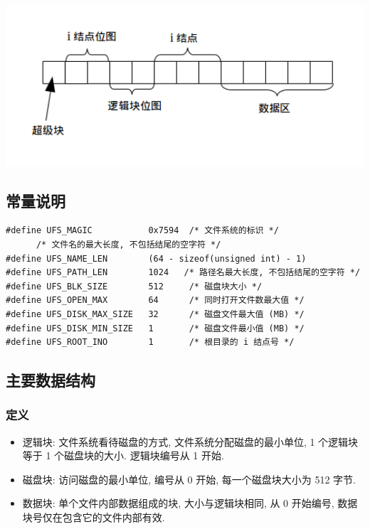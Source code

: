 \documentclass[nofonts, titlepage]{ctexart}
\begin{document}
\begin{center}
\includegraphics[width=14cm]{./images/./layout.png}
\label{fig:layout}
\end{center}

\subsection{常量说明}\label{ux5e38ux91cfux8bf4ux660e}

\begin{verbatim}
#define UFS_MAGIC           0x7594  /* 文件系统的标识 */
      /* 文件名的最大长度, 不包括结尾的空字符 */
#define UFS_NAME_LEN        (64 - sizeof(unsigned int) - 1)
#define UFS_PATH_LEN        1024   /* 路径名最大长度, 不包括结尾的空字符 */
#define UFS_BLK_SIZE        512     /* 磁盘块大小 */
#define UFS_OPEN_MAX        64      /* 同时打开文件数最大值 */
#define UFS_DISK_MAX_SIZE   32      /* 磁盘文件最大值 (MB) */
#define UFS_DISK_MIN_SIZE   1       /* 磁盘文件最小值 (MB) */
#define UFS_ROOT_INO        1       /* 根目录的 i 结点号 */
\end{verbatim}

\subsection{主要数据结构}\label{ux4e3bux8981ux6570ux636eux7ed3ux6784}

\subsubsection{定义}\label{ux5b9aux4e49-1}

\begin{itemize}
\item
  逻辑块: 文件系统看待磁盘的方式, 文件系统分配磁盘的最小单位, 1
  个逻辑块等于 1 个磁盘块的大小. 逻辑块编号从 1 开始.
\item
  磁盘块: 访问磁盘的最小单位, 编号从 0 开始, 每一个磁盘块大小为 512
  字节.
\item
  数据块: 单个文件内部数据组成的块, 大小与逻辑块相同, 从 0 开始编号,
  数据块号仅在包含它的文件内部有效.
\end{itemize}
\end{document}
